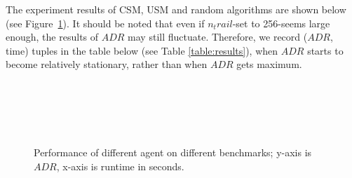\documentclass{article}
\begin{document}
The experiment results of CSM, USM and random algorithms are shown below (see Figure~\ref{fig:agent_adr_time}).
It should be noted that even if $n_trail$-set to 256-seems large enough, the results of $ADR$ may still fluctuate.
Therefore, we record ($ADR$, time) tuples in the table below (see Table \ref{table:results}), when $ADR$ starts
to become relatively stationary, rather than when $ADR$ gets maximum. 

\begin{figure}[!h]
	\centering
	\\
 \\
 \\
 \\
 \caption{Performance of different agent on different benchmarks; y-axis is $ADR$,
 x-axis is runtime in seconds.}
 \label{fig:agent_adr_time}
\end{figure}
\end{document}
